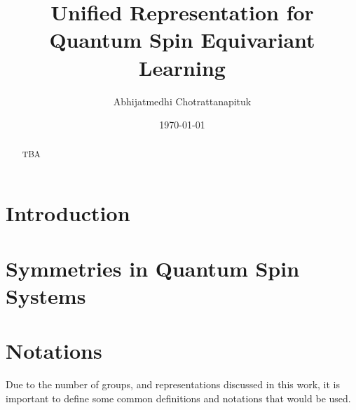 \documentclass[preprint, 12pt]{revtex4-2}
\numberwithin{equation}{section}
\begin{document}
\title{Unified Representation for Quantum Spin Equivariant Learning}

\author{Abhijatmedhi Chotrattanapituk}

\date{\today}

\begin{abstract}
    TBA
\end{abstract}

\maketitle
\newpage

\section{Introduction}

\section{Symmetries in Quantum Spin Systems}

\newpage
\section{Notations}
Due to the number of groups, and representations discussed in this work, it is important to define some common definitions and notations that would be used. 
\end{document}
